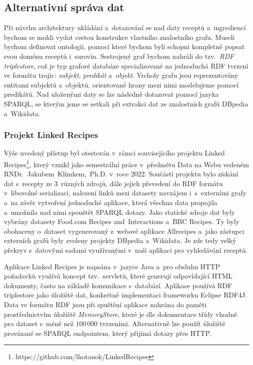 \subsection{Alternativní správa dat}

Při návrhu architektury ukládání a~dotazování se nad daty receptů a~ingrediencí bychom se mohli vydat cestou konstrukce vlastního znalostního grafu. Museli bychom definovat ontologii, pomocí které bychom byli schopni kompletně popsat svou doménu receptů i~surovin. Sestrojený graf bychom nahráli do tzv.~\emph{RDF triplestore}, což je typ grafové databáze specializované na jednoduchá RDF tvrzení ve formátu trojic: \emph{subjekt}, \emph{predikát} a~\emph{objekt}. Vrcholy grafu jsou reprezentovány entitami subjektů a~objektů, orientované hrany mezi nimi modelujeme pomocí predikátů. Nad uloženými daty se lze následně dotazovat pomocí jazyka SPARQL, se kterým jsme se setkali při extrakci dat ze znalostních grafů DBpedia a~Wikidata.

\subsubsection{Projekt Linked Recipes}

Výše uvedený přístup byl otestován v~rámci souvisejícího projektu Linked \,Recipes\footnote{https://github.com/lhotanok/LinkedRecipes}, který vznikl jako semestrální práce v~předmětu Data na Webu vedeném RNDr.~Jakubem~Klímkem,~Ph.D. v~roce $2022$. Součástí projektu bylo získání dat s~recepty ze $3$~různých zdrojů, dále jejich převedení do RDF formátu v~libovolné serializaci, nalezení linků mezi datasety navzájem i~s~externími grafy a~na závěr vytvoření jednoduché aplikace, která všechna data propojila a~umožnila nad nimi spouštět SPARQL dotazy. Jako statické zdroje dat byly vybrány datasety Food.com Recipes and~Interactions a~BBC Recipes. Ty byly obohaceny o~dataset vygenerovaný z~webové aplikace Allrecipes a~jako zástupci externích grafů byly zvoleny projekty DBpedia a~Wikidata. Je zde tedy velký překryv s~datovými sadami využívanými v~naší aplikaci pro vyhledávání receptů.

Aplikace Linked Recipes je napsána v~jazyce Java a~pro obsluhu HTTP požadavků využívá koncept tzv.~servletů, které generují odpovídající HTML dokumenty, často na základě komunikace s~databází. Aplikace používá RDF triplestore jako úložiště dat, konkrétně implementaci frameworku Eclipse RDF4J. Data ve formátu RDF jsou při spuštění aplikace nahrána do paměti prostřednictvím úložiště \emph{MemoryStore}, které je dle dokumentace třídy vhodné pro dataset s~méně než $100\,000$ tvrzeními. Alternativně lze použít úložiště provázané se SPARQL endpointem, který přijímá dotazy přes HTTP.

